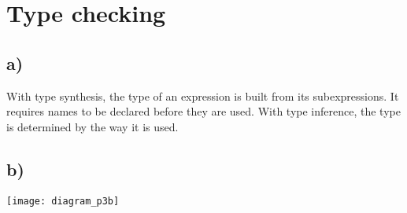 \section{Type checking}
\subsection{a)}
With type synthesis, the type of an expression is built from its subexpressions. It requires names to be declared before they are used. With type inference, the type is determined by the way it is used. 
\subsection{b)}
\texttt{[image: diagram\_p3b]}

